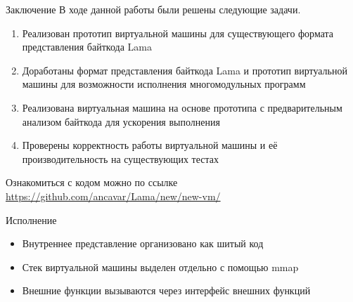 \documentclass
  [ russian
  , aspectratio=1610
  ] {beamer}
\begin{document}
\begin{frame}{Заключение}
  В ходе данной работы были решены следующие задачи.
    \begin{enumerate}
        \item Реализован прототип виртуальной машины для существующего формата представления байткода Lama
        \item Доработаны формат представления байткода Lama и прототип виртуальной машины для возможности исполнения многомодульных программ
        \item Реализована виртуальная машина на основе прототипа с предварительным анализом байткода для ускорения выполнения
        \item Проверены корректность работы виртуальной машины и её производительность на существующих тестах
    \end{enumerate}
    Ознакомиться с кодом можно по ссылке \url{https://github.com/ancavar/Lama/new/new-vm/}
\end{frame}


\begin{frame}{Исполнение}
    \begin{center}
        \resizebox{!}{0.62\textheight}{}
    \end{center}
    \begin{itemize}
        \item Внутреннее представление организовано как шитый код
        \item Стек виртуальной машины выделен отдельно с помощью mmap 
        \item Внешние функции вызываются через интерфейс внешних функций
    \end{itemize}
\end{frame}
\end{document}
